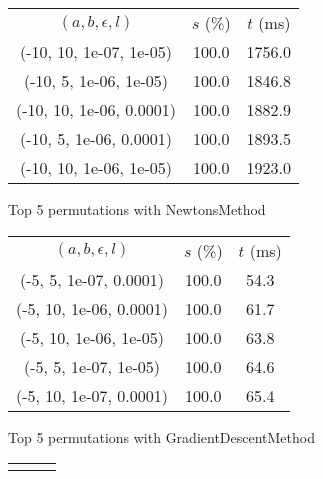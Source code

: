 \begin{figure}[H]
\label{fig:param_comp_NegativeEntropy_DichotomousSearch}
\begin{subfigure}[ht]{.5\textwidth}
\begin{tabular}{|c|c|c|}
\hline
\rowcolor{gray!25}
\multicolumn{3}{|c|}{NewtonsMethod} \\
\hline
\rowcolor{gray!25}
$(a,b,\epsilon,l)$ & $s$ (\%) & $t$ (ms) \\
\hline
(-10, 10, 1e-07, 1e-05) & 100.0 & 1756.0 \\
(-10, 5, 1e-06, 1e-05) & 100.0 & 1846.8 \\
(-10, 10, 1e-06, 0.0001) & 100.0 & 1882.9 \\
(-10, 5, 1e-06, 0.0001) & 100.0 & 1893.5 \\
(-10, 10, 1e-06, 1e-05) & 100.0 & 1923.0 \\
\hline
\end{tabular}
\caption{Top 5 permutations with NewtonsMethod}
\label{subfig:param_comp_NegativeEntropy_NewtonsMethod_DichotomousSearch}
\end{subfigure}
\hfill
\begin{subfigure}[ht]{.5\textwidth}
\begin{tabular}{|c|c|c|}
\hline
\rowcolor{gray!25}
\multicolumn{3}{|c|}{GradientDescentMethod} \\
\hline
\rowcolor{gray!25}
$(a,b,\epsilon,l)$ & $s$ (\%) & $t$ (ms) \\
\hline
(-5, 5, 1e-07, 0.0001) & 100.0 & 54.3 \\
(-5, 10, 1e-06, 0.0001) & 100.0 & 61.7 \\
(-5, 10, 1e-06, 1e-05) & 100.0 & 63.8 \\
(-5, 5, 1e-07, 1e-05) & 100.0 & 64.6 \\
(-5, 10, 1e-07, 0.0001) & 100.0 & 65.4 \\
\hline
\end{tabular}
\caption{Top 5 permutations with GradientDescentMethod}
\label{subfig:param_comp_NegativeEntropy_GradientDescentMethod_DichotomousSearch}
\end{subfigure}
\hfill
\begin{subfigure}[ht]{.5\textwidth}
\begin{tabular}{|c|c|c|}
\hline
\rowcolor{gray!25}

\end{tabular}
\end{subfigure}
\end{figure}
